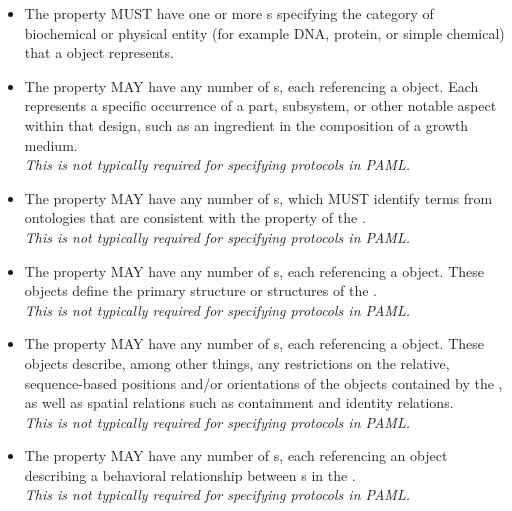 \begin{itemize}
\item \label{sec:sbol:type:C}
The  property MUST have one or more s specifying the category of biochemical or physical entity (for example DNA, protein, or simple chemical) that a  object represents.

\item \label{sec:sbol:hasFeature}
The  property MAY have any number of s, each referencing a  object. Each  represents a specific occurrence of a part, subsystem, or other notable aspect within that design, such as an ingredient in the composition of a growth medium.
\\{\em This is not typically required for specifying protocols in PAML.}

\item \label{sec:sbol:role:C}
The  property MAY have any number of s, which MUST identify terms from ontologies that are consistent with the  property of the . 
\\{\em This is not typically required for specifying protocols in PAML.}

\item \label{sec:sbol:hasSequence:C}
The  property MAY have any number of s, each referencing a  object.  These objects define the primary structure or structures of the .
\\{\em This is not typically required for specifying protocols in PAML.}

\item \label{sec:sbol:hasConstraint}
The  property MAY have any number of s, each referencing a  object.
These objects describe, among other things, any restrictions on the relative, sequence-based positions and/or orientations of the  objects contained by the , as well as spatial relations such as containment and identity relations.
\\{\em This is not typically required for specifying protocols in PAML.}

\item \label{sec:sbol:hasInteraction}
The  property MAY have any number of s, each referencing an  object describing a behavioral relationship between s in the .
\\{\em This is not typically required for specifying protocols in PAML.}


\end{itemize}
